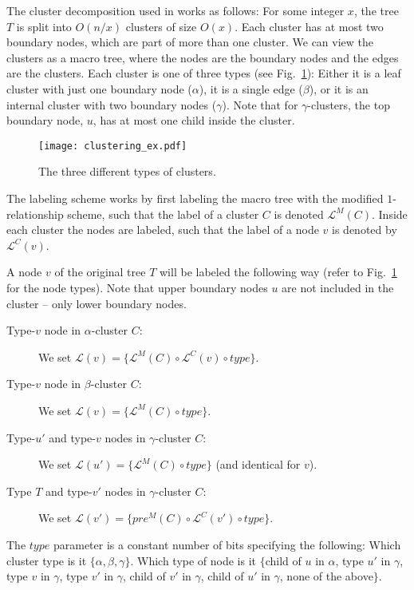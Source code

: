 \documentclass{llncs}
\newcommand{\la}{\ensuremath{ \mathcal{L}}}
\begin{document}
The cluster decomposition used in \cite{Alstrup02} works as follows: For some
integer $x$, the tree $T$ is split into $O(n/x)$ clusters of size $O(x)$. Each
cluster has at most two boundary nodes, which are part of more than one
cluster. We can view the clusters as a macro tree, where the nodes are the
boundary nodes and the edges are the clusters. Each cluster is one of three
types (see Fig.~\ref{fig:cluster_ex}): Either it is a leaf cluster
with just one boundary node ($\alpha$), it is a single edge ($\beta$), or it is
an internal cluster with two boundary nodes ($\gamma$). Note that for
$\gamma$-clusters, the top boundary node, $u$, has at most one child inside the
cluster.

\begin{figure}[htbp]
    \centering
    \texttt{[image: clustering\_ex.pdf]}
    \caption{The three different types of clusters.}
    \label{fig:cluster_ex}
\end{figure}

The labeling scheme works by first labeling the macro tree with the modified
$1$-relationship scheme, such that the label of a cluster $C$ is denoted
$\la^M(C)$. Inside each cluster the nodes are labeled, such that the label of a
node $v$ is denoted by $\la^C(v)$.

A node $v$ of the original tree $T$ will be labeled the following way (refer to
Fig.~\ref{fig:cluster_ex} for the node types). Note that upper boundary nodes
$u$ are not included in the cluster -- only lower boundary nodes.
\begin{description}
    \item [Type-$v$ node in $\alpha$-cluster $C$:] We set $\la(v) =
        \{\la^M(C)\circ\la^C(v)\circ type\}$.
    \item [Type-$v$ node in $\beta$-cluster $C$:] We set $\la(v) =
        \{\la^M(C)\circ type\}$.
    \item [Type-$u'$ and type-$v$ nodes in $\gamma$-cluster $C$:] We set
        $\la(u') = \{\la^M(C)\circ type\}$ (and identical for $v$).
    \item [Type $T$ and type-$v'$ nodes in $\gamma$-cluster $C$:] We set
        $\la(v') = \{pre^M(C)\circ\la^C(v')\circ type\}$.
\end{description}

The $type$ parameter is a constant number of bits specifying the following:
Which cluster type is it $\{\alpha,\beta,\gamma\}$. Which type of node is it
$\{$child of $u$ in $\alpha$, type $u'$ in $\gamma$, type $v$ in $\gamma$,
type $v'$ in $\gamma$, child of $v'$ in $\gamma$, child of $u'$ in
$\gamma$, none of the above$\}$.
\end{document}

